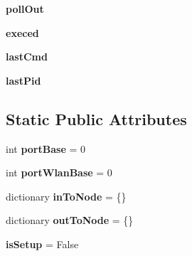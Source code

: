 \begin{DoxyCompactItemize}
\item 
\hypertarget{classmininet_1_1node_1_1Node_af2e6d9b5d278c9e46d369a62b39dab86}{{\bfseries poll\-Out}}\label{classmininet_1_1node_1_1Node_af2e6d9b5d278c9e46d369a62b39dab86}

\item 
\hypertarget{classmininet_1_1node_1_1Node_aaf3d6cf50da7eaa7b52c24997eca5023}{{\bfseries execed}}\label{classmininet_1_1node_1_1Node_aaf3d6cf50da7eaa7b52c24997eca5023}

\item 
\hypertarget{classmininet_1_1node_1_1Node_a2421f6657870f65e0d4e280f3966a190}{{\bfseries last\-Cmd}}\label{classmininet_1_1node_1_1Node_a2421f6657870f65e0d4e280f3966a190}

\item 
\hypertarget{classmininet_1_1node_1_1Node_a532a23b5539c023cb0dd8f92025fbaa8}{{\bfseries last\-Pid}}\label{classmininet_1_1node_1_1Node_a532a23b5539c023cb0dd8f92025fbaa8}

\end{DoxyCompactItemize}
\subsection*{Static Public Attributes}
\begin{DoxyCompactItemize}
\item 
\hypertarget{classmininet_1_1node_1_1Node_ad3ff96047551b59c030fb002e92d9ddc}{int {\bfseries port\-Base} = 0}\label{classmininet_1_1node_1_1Node_ad3ff96047551b59c030fb002e92d9ddc}

\item 
\hypertarget{classmininet_1_1node_1_1Node_a207454e6896d503346f70539b11a94bd}{int {\bfseries port\-Wlan\-Base} = 0}\label{classmininet_1_1node_1_1Node_a207454e6896d503346f70539b11a94bd}

\item 
\hypertarget{classmininet_1_1node_1_1Node_a2b2f264edd216076c8061b106175872c}{dictionary {\bfseries in\-To\-Node} = \{\}}\label{classmininet_1_1node_1_1Node_a2b2f264edd216076c8061b106175872c}

\item 
\hypertarget{classmininet_1_1node_1_1Node_a4ed3f6ef4a5955c35f4a2f5c6a327201}{dictionary {\bfseries out\-To\-Node} = \{\}}\label{classmininet_1_1node_1_1Node_a4ed3f6ef4a5955c35f4a2f5c6a327201}

\item 
\hypertarget{classmininet_1_1node_1_1Node_a336ba69db8fe753e780df804a25f391b}{{\bfseries is\-Setup} = False}\label{classmininet_1_1node_1_1Node_a336ba69db8fe753e780df804a25f391b}

\end{DoxyCompactItemize}


